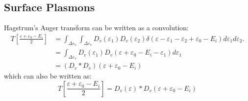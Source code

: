 \begin{refsection}
\section{Surface Plasmons} 
 
Hagstrum's Auger transform can be written as a convolution: 
\begin{equation} 
\begin{aligned} 
T\left[\frac{\varepsilon + \varepsilon_0 - E_i}{2}\right] &= 
\int_{\Delta\varepsilon_v}\int_{\Delta\varepsilon_v} D_v (\varepsilon_1) D_v 
(\varepsilon_2) \delta(\varepsilon - \varepsilon_1 - \varepsilon_2 + 
\varepsilon_0 - E_i) d\varepsilon_1 d\varepsilon_2. \\ 
&= \int_{\Delta\varepsilon_v} D_v (\varepsilon_1) D_v (\varepsilon + 
\varepsilon_0 - E_i - \varepsilon_1) d\varepsilon_1 \\  
&= (D_v * D_v) (\varepsilon + \varepsilon_0 - E_i) 
\end{aligned} 
\end{equation} 
which can also be written as: 
\begin{equation} 
T\left[\frac{\varepsilon + \varepsilon_0 - E_i}{2}\right] = D_v(\varepsilon) * 
D_v(\varepsilon + \varepsilon_0 - E_i) 
\end{equation} 
 

\end{refsection}
